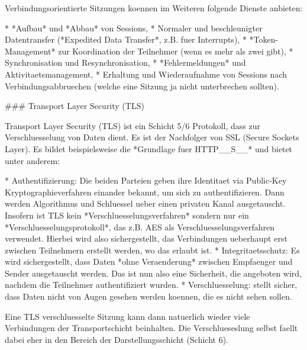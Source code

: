 Verbindungsorientierte Sitzungen koennen im Weiteren folgende Dienste anbieten:

* *Aufbau* und *Abbau* von Sessions,
* Normaler und beschleunigter Datentransfer (*Expedited Data Transfer*,
  z.B. fuer Interrupts),
* *Token-Management* zur Koordination der Teilnehmer (wenn es mehr als zwei gibt),
* Synchronisation und Resynchronisation,
* *Fehlermeldungen* und Aktivitaetsmanagement,
* Erhaltung und Wiederaufnahme von Sessions nach Verbindungsabbruechen (welche
  eine Sitzung ja nicht unterbrechen sollten).

### Transport Layer Security (TLS)

Transport Layer Security (TLS) ist ein Schicht 5/6 Protokoll, dass zur
Verschluesselung von Daten dient. Es ist der Nachfolger von SSL (Secure Sockets
Layer). Es bildet beispielsweise die *Grundlage fuer HTTP__S__* und bietet unter
anderem:

* Authentifizierung: Die beiden Parteien geben ihre Identitaet via Public-Key
  Kryptographieverfahren einander bekannt, um sich zu authentifizieren. Dann
  werden Algorithmus und Schluessel ueber einen privaten Kanal
  ausgetauscht. Insofern ist TLS kein *Verschluesselungsverfahren* sondern nur
  ein *Verschluesselungsprotokoll*, das z.B. AES als Verschluesselungsverfahren
  verwendet. Hierbei wird also sichergestellt, das Verbindungen ueberhaupt erst
  zwischen Teilnehmern erstellt werden, wo das erlaubt ist.
* Integritaetsschutz: Es wird sichergestellt, dass Daten *ohne Veraenderung*
  zwischen Empfaenger und Sender ausgetauscht werden. Das ist nun also eine
  Sicherheit, die angeboten wird, nachdem die Teilnehmer authentifiziert
  wurden.
* Verschluesselung: stellt sicher, dass Daten nicht von Augen gesehen werden
  koennen, die es nicht sehen sollen.

Eine TLS verschluesselte Sitzung kann dann natuerlich wieder viele Verbindungen
der Transportschicht beinhalten. Die Verschlueseslung selbst faellt dabei eher
in den Bereich der Darstellungsschicht (Schicht 6).
